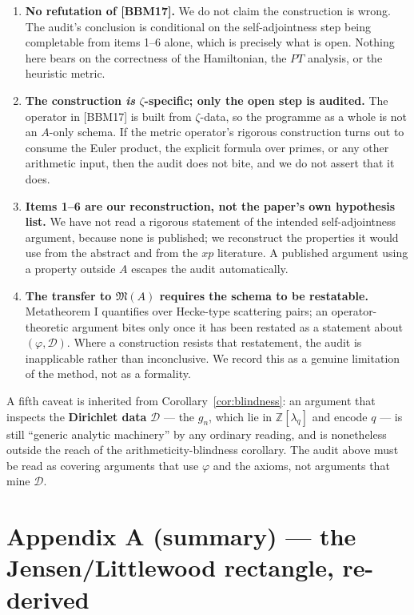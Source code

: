 \documentclass[11pt]{amsart}
\theoremstyle{remark}
\begin{document}
\begin{enumerate}
\item \textbf{No refutation of [BBM17].} We do not claim the
construction is wrong. The audit's conclusion is conditional on the
self-adjointness step being completable from items 1--6 alone, which is
precisely what is open. Nothing here bears on the correctness of the
Hamiltonian, the $PT$ analysis, or the heuristic metric.
\item \textbf{The construction \emph{is} $\zeta$-specific; only the open
step is audited.} The operator in [BBM17] is built from $\zeta$-data, so
the programme as a whole is not an $A$-only schema. If the metric
operator's rigorous construction turns out to consume the Euler product,
the explicit formula over primes, or any other arithmetic input, then
the audit does not bite, and we do not assert that it does.
\item \textbf{Items 1--6 are our reconstruction, not the paper's own
hypothesis list.} We have not read a rigorous statement of the intended
self-adjointness argument, because none is published; we reconstruct the
properties it would use from the abstract and from the $xp$ literature.
A published argument using a property outside $A$ escapes the audit
automatically.
\item \textbf{The transfer to $\mathfrak M(A)$ requires the schema to be
restatable.} Metatheorem I quantifies over Hecke-type scattering pairs;
an operator-theoretic argument bites only once it has been restated as a
statement about $(\varphi,\mathcal D)$. Where a construction resists that
restatement, the audit is inapplicable rather than inconclusive. We
record this as a genuine limitation of the method, not as a formality.
\end{enumerate}

A fifth caveat is inherited from Corollary~\ref{cor:blindness}: an
argument that inspects the \textbf{Dirichlet data} $\mathcal D$ --- the
$g_n$, which lie in $\mathbb Z[\lambda_q]$ and encode $q$ --- is still
``generic analytic machinery'' by any ordinary reading, and is
nonetheless outside the reach of the arithmeticity-blindness corollary.
The audit above must be read as covering arguments that use $\varphi$
and the axioms, not arguments that mine $\mathcal D$.

\section{Appendix A (summary) --- the Jensen/Littlewood rectangle, re-derived}
\end{document}
